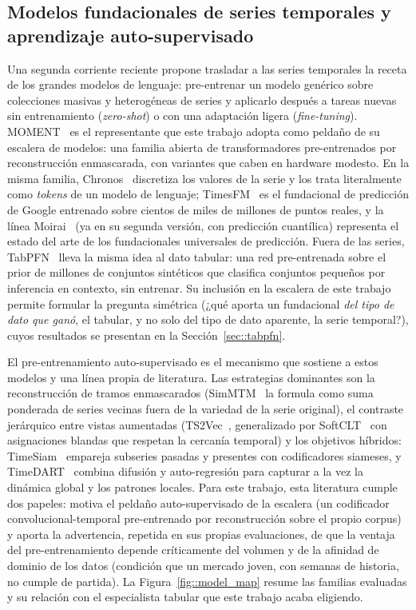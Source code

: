 \subsection{Modelos fundacionales de series temporales y aprendizaje auto-supervisado}

Una segunda corriente reciente propone trasladar a las series temporales la receta de
los grandes modelos de lenguaje: pre-entrenar un modelo genérico sobre colecciones
masivas y heterogéneas de series y aplicarlo después a tareas nuevas sin entrenamiento
(\emph{zero-shot}) o con una adaptación ligera (\emph{fine-tuning}).
MOMENT~\cite{goswami2024moment} es el representante que este trabajo adopta como
peldaño de su escalera de modelos: una familia abierta de transformadores
pre-entrenados por reconstrucción enmascarada, con variantes que caben en hardware
modesto. En la misma familia, Chronos~\cite{ansari2024chronos} discretiza los valores
de la serie y los trata literalmente como \emph{tokens} de un modelo de lenguaje;
TimesFM~\cite{das2024timesfm} es el fundacional de predicción de Google entrenado
sobre cientos de miles de millones de puntos reales, y la línea
Moirai~\cite{liu2025moirai2} (ya en su segunda versión, con predicción cuantílica)
representa el estado del arte de los fundacionales universales de predicción. Fuera de
las series, TabPFN~\cite{hollmann2025tabpfn} lleva la misma idea al dato tabular:
una red pre-entrenada sobre el prior de millones de conjuntos sintéticos que
clasifica conjuntos pequeños por inferencia en contexto, sin entrenar. Su inclusión
en la escalera de este trabajo permite formular la pregunta simétrica (¿qué aporta
un fundacional \emph{del tipo de dato que ganó}, el tabular, y no solo del tipo de
dato aparente, la serie temporal?), cuyos resultados se presentan en la
Sección~\ref{sec::tabpfn}.

El pre-entrenamiento auto-supervisado es el mecanismo que sostiene a estos modelos y
una línea propia de literatura. Las estrategias dominantes son la reconstrucción de
tramos enmascarados (SimMTM~\cite{dong2023simmtm} la formula como suma ponderada de
series vecinas fuera de la variedad de la serie original), el contraste jerárquico
entre vistas aumentadas (TS2Vec~\cite{yue2022ts2vec}, generalizado por
SoftCLT~\cite{lee2024softclt} con asignaciones blandas que respetan la cercanía
temporal) y los objetivos híbridos: TimeSiam~\cite{dong2024timesiam} empareja
subseries pasadas y presentes con codificadores siameses, y
TimeDART~\cite{wang2025timedart} combina difusión y auto-regresión para capturar a la
vez la dinámica global y los patrones locales. Para este trabajo, esta literatura
cumple dos papeles: motiva el peldaño auto-supervisado de la escalera (un codificador
convolucional-temporal pre-entrenado por reconstrucción sobre el propio corpus) y
aporta la advertencia, repetida en sus propias evaluaciones, de que la ventaja del
pre-entrenamiento depende críticamente del volumen y de la afinidad de dominio de los
datos (condición que un mercado joven, con semanas de historia, no cumple de partida).
La Figura~\ref{fig::model_map} resume las familias evaluadas y su relación con el
especialista tabular que este trabajo acaba eligiendo.


